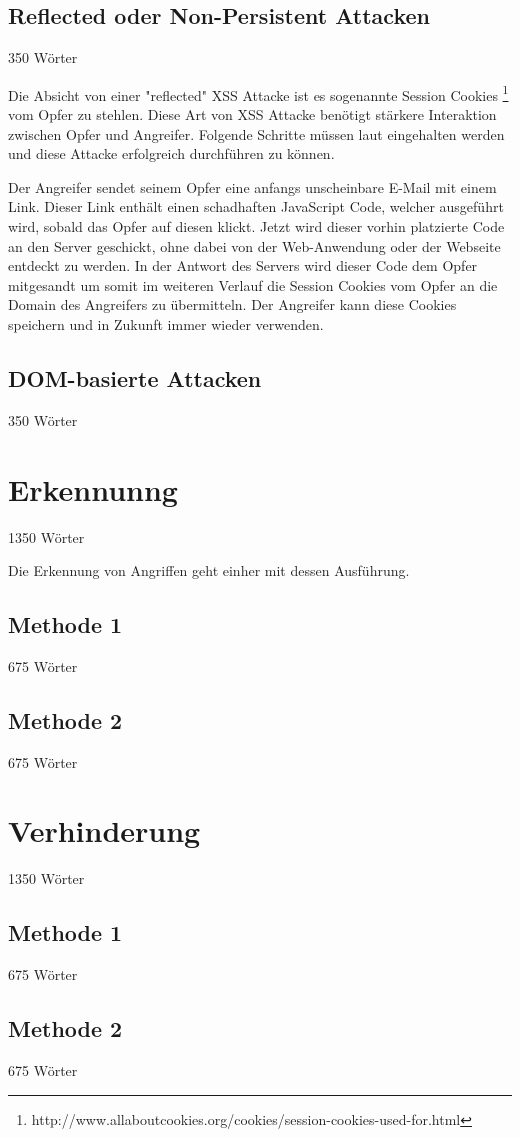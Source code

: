 \subsection{Reflected oder Non-Persistent Attacken}
\label{subsection:reflective attacks} 350 Wörter

Die Absicht von einer "reflected" XSS Attacke ist es sogenannte Session Cookies \footnote[4]{http://www.allaboutcookies.org/cookies/session-cookies-used-for.html} vom Opfer zu stehlen. Diese Art von XSS Attacke benötigt stärkere Interaktion zwischen Opfer und Angreifer. Folgende Schritte müssen laut \textcite[2]{mahmoud2017} eingehalten werden und diese Attacke erfolgreich durchführen zu können.

Der Angreifer sendet seinem Opfer eine anfangs unscheinbare E-Mail mit einem Link. Dieser Link enthält einen schadhaften JavaScript Code, welcher ausgeführt wird, sobald das Opfer auf diesen klickt. Jetzt wird dieser vorhin platzierte Code an den Server geschickt, ohne dabei von der Web-Anwendung oder der Webseite entdeckt zu werden. In der Antwort des Servers wird dieser Code dem Opfer mitgesandt um somit im weiteren Verlauf die Session Cookies vom Opfer an die Domain des Angreifers zu übermitteln. Der Angreifer kann diese Cookies speichern und in Zukunft immer wieder verwenden.\autocite[2]{mahmoud2017}

\subsection{DOM-basierte Attacken}
\label{subsection:DOM-based Attacks} 350 Wörter




\section{Erkennunng}
\label{section:Detection} 1350 Wörter

Die Erkennung von Angriffen geht einher mit dessen Ausführung.

\subsection{Methode 1}
\label{subsection:Method1} 675 Wörter

\subsection{Methode 2}
\label{subsection:Method2} 675 Wörter

\section{Verhinderung} 1350 Wörter
\label{section:Prevention}

\subsection{Methode 1}
\label{subsection:Method1} 675 Wörter

\subsection{Methode 2}
\label{subsection:Method2} 675 Wörter
